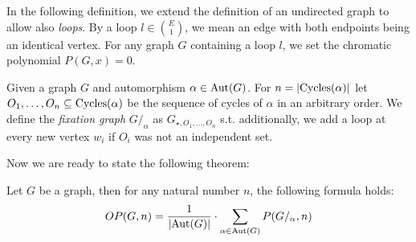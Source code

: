 In the following definition, we extend the definition of an undirected graph to allow also \textit{loops}. By a loop $l \in \binom{E}{1}$, we mean an edge with both endpoints being an identical vertex. For any graph $G$ containing a loop $l$, we set the chromatic polynomial $P(G,x) = 0$.

\begin{defn}
    Given a graph $G$ and automorphism $\alpha \in \operatorname{Aut}(G)$. For $n = \left|{\operatorname{Cycles}(\alpha)}\right|$ let $O_1, \ldots ,O_n \subseteq \operatorname{Cycles}(\alpha)$ be the sequence of cycles of $\alpha$ in an arbitrary order. We define the \emph{fixation graph} $G /_{\alpha}$ as $G_{\star,O_1, \ldots , O_n}$ s.t. additionally, we add a loop at every new vertex $w_i$ if $O_i$ was not an independent set.
\end{defn}

Now we are ready to state the following theorem:

\begin{highlight}

\begin{thm} \label{thm:count-orb-chrompoly}
    Let $G$ be a graph, then for any natural number $n$, the following formula holds:
    \begin{equation} \label{eqn:oribtal-chrompoly}
        OP(G,n) = \frac{1}{\left|{\operatorname{Aut}(G)}\right|} \cdot \sum_{\alpha \in \operatorname{Aut}(G)}P(G/_\alpha,n)
    \end{equation}
\end{thm}

\end{highlight}

